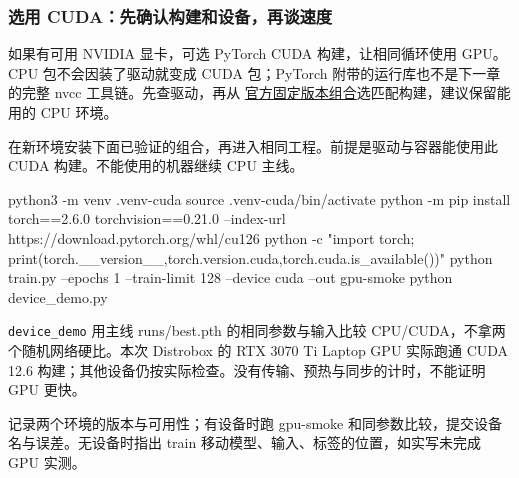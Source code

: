 \subsubsection{选用 CUDA：先确认构建和设备，再谈速度}
如果有可用 NVIDIA 显卡，可选 PyTorch CUDA 构建，让相同循环使用 GPU。CPU 包不会因装了驱动就变成 CUDA 包；PyTorch 附带的运行库也不是下一章的完整 nvcc 工具链。先查驱动，再从 \href{https://docs.pytorch.org/get-started/previous-versions/}{官方固定版本组合}选匹配构建，建议保留能用的 CPU 环境。
\begin{example}[本机可用时走相同训练路径]
在新环境安装下面已验证的组合，再进入相同工程。前提是驱动与容器能使用此 CUDA 构建。不能使用的机器继续 CPU 主线。
\begin{tbash}
python3 -m venv .venv-cuda
source .venv-cuda/bin/activate
python -m pip install torch==2.6.0 torchvision==0.21.0 --index-url https://download.pytorch.org/whl/cu126
python -c "import torch; print(torch.__version__,torch.version.cuda,torch.cuda.is_available())"
python train.py --epochs 1 --train-limit 128 --device cuda --out gpu-smoke
python device_demo.py
\end{tbash}
\end{example}
\texttt{device\_demo} 用主线 runs/best.pth 的相同参数与输入比较 CPU/CUDA，不拿两个随机网络硬比。本次 Distrobox 的 RTX 3070 Ti Laptop GPU 实际跑通 CUDA 12.6 构建；其他设备仍按实际检查。没有传输、预热与同步的计时，不能证明 GPU 更快。
\begin{dlblock}

\end{dlblock}
\begin{exercise}\label{ex:v2-dl-device}
记录两个环境的版本与可用性；有设备时跑 gpu-smoke 和同参数比较，提交设备名与误差。无设备时指出 train 移动模型、输入、标签的位置，如实写未完成 GPU 实测。
\end{exercise}

